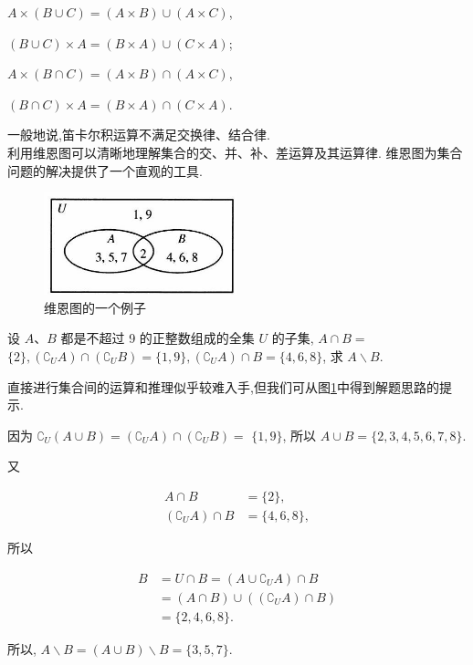 $A \times(B \cup C)=(A \times B) \cup(A \times C)$,

$(B \cup C) \times A=(B \times A) \cup(C \times A)$;

$A \times(B \cap C)=(A \times B) \cap(A \times C)$,

$(B \cap C) \times A=(B \times A) \cap(C \times A)$.

一般地说,笛卡尔积运算不满足交换律、结合律.\\
利用维恩图可以清晰地理解集合的交、并、补、差运算及其运算律. 维恩图为集合问题的解决提供了一个直观的工具.
\begin{figure}[ht]
	\centering
	\includegraphics[width=0.5\textwidth]{images/2024_05_17_3b020e8fe1313185a92eg-014.jpg}
	\caption{维恩图的一个例子}
	\label{fig:Venn}
\end{figure}

\begin{example}
	设 $A 、 B$ 都是不超过 9 的正整数组成的全集 $U$ 的子集, $A \cap B=$ $\{2\},\left(\complement_{U} A\right) \cap\left(\complement_{U} B\right)=\{1,9\},\left(\complement_{U} A\right) \cap B=\{4,6,8\}$, 求 $A \backslash B$.
\end{example}

\begin{analysis}
	直接进行集合间的运算和推理似乎较难入手,但我们可从图\ref{fig:Venn}中得到解题思路的提示.
\end{analysis}

\begin{solution}
	因为 $\complement_{U}(A \cup B)=\left(\complement_{U} A\right) \cap\left(\complement_{U} B\right)=$ $\{1,9\}$, 所以 $A \cup B=\{2,3,4,5,6,7,8\}$.

	又

	$$
		\begin{aligned}
			A \cap B                              & =\{2\},     \\
			\left(\complement_{U} A\right) \cap B & =\{4,6,8\},
		\end{aligned}
	$$




	所以

	$$
		\begin{aligned}
			B & =U \cap B=\left(A \cup \complement_{U} A\right) \cap B             \\
			  & =(A \cap B) \cup\left(\left(\complement_{U} A\right) \cap B\right) \\
			  & =\{2,4,6,8\} .
		\end{aligned}
	$$

	所以, $A \backslash B=(A \cup B) \backslash B=\{3,5,7\}$.

\end{solution}

